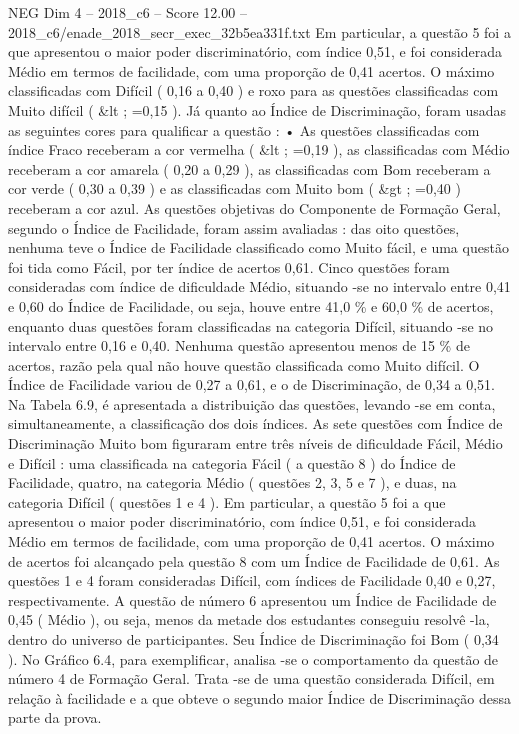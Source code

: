 \begin{textsample}{NEG Dim 4 – 2018\_c6 – Score 12.00 – 2018\_c6/enade\_2018\_secr\_exec\_32b5ea331f.txt}
Em particular, a questão 5 foi a que apresentou o maior poder discriminatório, com índice 0,51, e foi considerada Médio em termos de facilidade, com uma proporção de 0,41 acertos.
O máximo classificadas com Difícil ( 0,16 a 0,40 ) e roxo para as questões classificadas com Muito difícil ( \&lt ; =0,15 ).
Já quanto ao Índice de Discriminação, foram usadas as seguintes cores para qualificar a questão : • As questões classificadas com índice Fraco receberam a cor vermelha ( \&lt ; =0,19 ), as classificadas com Médio receberam a cor amarela ( 0,20 a 0,29 ), as classificadas com Bom receberam a cor verde ( 0,30 a 0,39 ) e as classificadas com Muito bom ( \&gt ; =0,40 ) receberam a cor azul.
As questões objetivas do Componente de Formação Geral, segundo o Índice de Facilidade, foram assim avaliadas : das oito questões, nenhuma teve o Índice de Facilidade classificado como Muito fácil, e uma questão foi tida como Fácil, por ter índice de acertos 0,61.
Cinco questões foram consideradas com índice de dificuldade Médio, situando -se no intervalo entre 0,41 e 0,60 do Índice de Facilidade, ou seja, houve entre 41,0 \% e 60,0 \% de acertos, enquanto duas questões foram classificadas na categoria Difícil, situando -se no intervalo entre 0,16 e 0,40.
Nenhuma questão apresentou menos de 15 \% de acertos, razão pela qual não houve questão classificada como Muito difícil.
O Índice de Facilidade variou de 0,27 a 0,61, e o de Discriminação, de 0,34 a 0,51.
Na Tabela 6.9, é apresentada a distribuição das questões, levando -se em conta, simultaneamente, a classificação dos dois índices.
As sete questões com Índice de Discriminação Muito bom figuraram entre três níveis de dificuldade Fácil, Médio e Difícil : uma classificada na categoria Fácil ( a questão 8 ) do Índice de Facilidade, quatro, na categoria Médio ( questões 2, 3, 5 e 7 ), e duas, na categoria Difícil ( questões 1 e 4 ).
Em particular, a questão 5 foi a que apresentou o maior poder discriminatório, com índice 0,51, e foi considerada Médio em termos de facilidade, com uma proporção de 0,41 acertos.
O máximo de acertos foi alcançado pela questão 8 com um Índice de Facilidade de 0,61.
As questões 1 e 4 foram consideradas Difícil, com índices de Facilidade 0,40 e 0,27, respectivamente.
A questão de número 6 apresentou um Índice de Facilidade de 0,45 ( Médio ), ou seja, menos da metade dos estudantes conseguiu resolvê -la, dentro do universo de participantes.
Seu Índice de Discriminação foi Bom ( 0,34 ).
No Gráfico 6.4, para exemplificar, analisa -se o comportamento da questão de número 4 de Formação Geral.
Trata -se de uma questão considerada Difícil, em relação à facilidade e a que obteve o segundo maior Índice de Discriminação dessa parte da prova.

\end{textsample}
